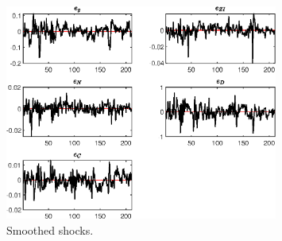  
\begin{figure}[H]
\centering 
\includegraphics[width=0.80\textwidth]{BRS_imp_mobility/graphs/BRS_imp_mobility_SmoothedShocks1}
\caption{Smoothed shocks.}\label{Fig:SmoothedShocks:1}
\end{figure}



